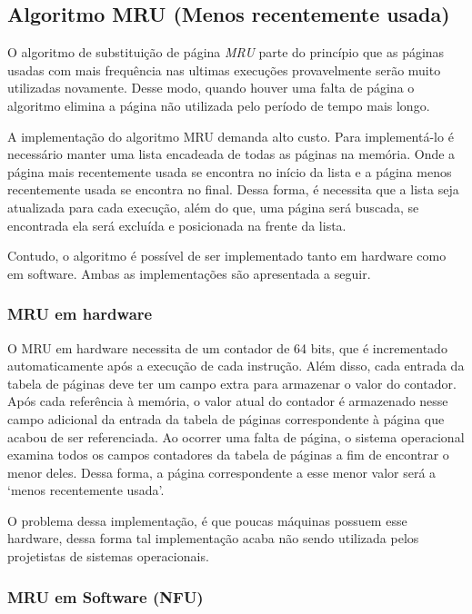 \subsection{Algoritmo MRU (Menos recentemente usada)}

O algoritmo de substituição de página \textit{MRU} parte do princípio que as páginas usadas com mais frequência nas ultimas execuções provavelmente serão muito utilizadas novamente. Desse modo, quando houver uma falta de página o algoritmo elimina a página não utilizada pelo período de tempo mais longo.

A implementação do algoritmo MRU demanda alto custo. Para implementá-lo é necessário manter uma lista encadeada de todas as páginas na memória. Onde a página mais recentemente usada se encontra no início da lista e a página menos recentemente usada se encontra no final. Dessa forma, é necessita que a lista seja atualizada para cada execução, além do que, uma página será buscada, se encontrada ela será excluída e posicionada
na frente da lista.

Contudo, o algoritmo é possível de ser implementado tanto em hardware como em software. Ambas as implementações são apresentada a seguir.

\subsubsection{MRU em hardware}

O MRU em hardware necessita de um contador de 64 bits, que é incrementado automaticamente após a execução de cada instrução. Além disso, cada entrada da tabela de páginas deve ter um campo extra para armazenar o valor do contador. Após cada referência à memória, o valor atual do contador é armazenado nesse campo adicional da entrada da tabela de páginas correspondente à página que acabou de ser referenciada. Ao ocorrer uma falta de página, o sistema operacional examina todos os campos contadores da tabela de páginas a fim de encontrar o menor deles. Dessa forma, a página correspondente a esse menor valor será a `menos recentemente usada'.

O problema dessa implementação, é que poucas máquinas possuem esse hardware, dessa forma tal implementação acaba não sendo utilizada pelos projetistas de sistemas operacionais.

\subsubsection{MRU em Software (NFU)}

